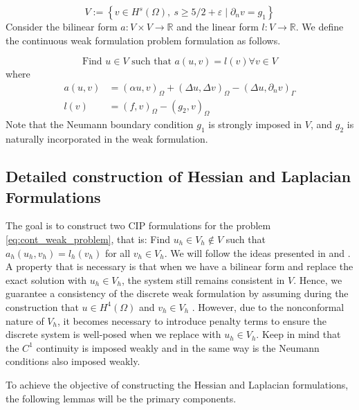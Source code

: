 \documentclass[11pt]{article}
\theoremstyle{remark}
\renewcommand{\ge}{\geqslant}
\numberwithin{equation}{section}
\begin{document}
\begin{equation}
\label{eq:V_deg}
V := \left\{ v \in  H^s( \Omega ), \  s \ge  5  /2 + \varepsilon   \mid \partial _{n} v  = g_{1}     \right\}
\end{equation}
Consider the bilinear form $a:V\times V \to \mathbb{R}$ and the linear form $l: V \to \mathbb{R}$. We define the continuous weak formulation problem formulation as follows.


\begin{equation}
\label{eq:cont_weak_problem}
\text{Find } u \in V   \text{ such that } a( u,v) = l( v)  \forall v \in V
\end{equation}
where
\begin{equation}
    \begin{split}
a( u,v) & =  ( \alpha u,v)_{\Omega } + ( \Delta u, \Delta v)_{\Omega } - (  \Delta u, \partial _{n} v) _{\Gamma }\\
l( v)  &= ( f,v)_{\Omega } - ( g_{2} , v)_\Omega
    \end{split}
\end{equation}
Note that the Neumann boundary condition $g_{1}$ is strongly imposed in $V$, and $g_{2}$ is naturally incorporated in the weak formulation.


\subsection{Detailed construction of Hessian and Laplacian Formulations }%
\label{sub:construction_of_laplacian_cip}
The goal is to construct two CIP formulations for the problem \eqref{eq:cont_weak_problem}, that is: Find $u_{h} \in V_{h} \not\in V$ such that $a_{h}( u_{h}, v_{h}) = l_{h}( v_{h}) $ for all $v_{h} \in V_{h}$. We will follow the ideas presented in \cite{brenner2012} and \cite{feng2007fully}.
A property that is necessary is that when we have a bilinear form and replace the exact solution with $u_{h} \in V_{h}$, the system still remains consistent in $V$. Hence, we guarantee a consistency of the discrete weak formulation by assuming during
the construction that $u \in H^{4}( \Omega ) $ and $v_{h} \in  V_{h}$ .
 However, due to the nonconformal nature of $V_{h}$, it becomes necessary to introduce penalty terms to ensure the discrete system is well-posed when we replace with $u_{h} \in V_{h}$. Keep in mind that the $C^{1}$
continuity is imposed weakly and in the same way is the Neumann conditions also imposed weakly.

To achieve the objective of constructing the Hessian and Laplacian formulations, the following lemmas will be the primary components.
\end{document}
